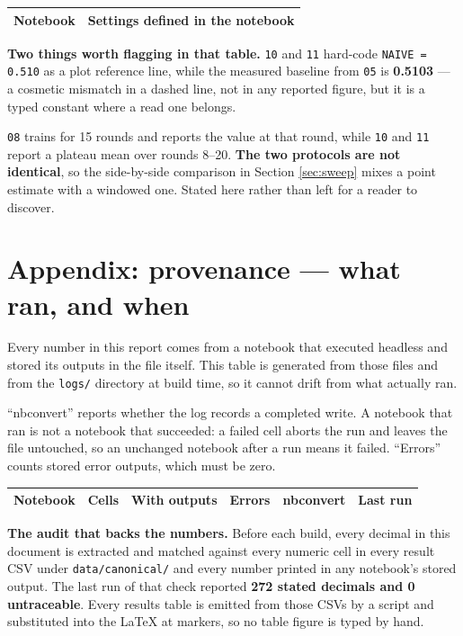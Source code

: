\documentclass[11pt,a4paper]{article}
\newcommand{\keypoint}[1]{%
  \par\vspace{0.4em}%
  \noindent\colorbox{fed!8}{\parbox{0.98\textwidth}{\vspace{0.2em}#1\vspace{0.2em}}}%
  \par\vspace{0.4em}}
\begin{document}
\begin{center}
\scriptsize
\begin{tabular}{@{}lp{11.2cm}@{}}
\toprule
\textbf{Notebook} & \textbf{Settings defined in the notebook} \\
\midrule
\bottomrule
\end{tabular}
\end{center}

\keypoint{\textbf{Two things worth flagging in that table.} \texttt{10} and \texttt{11} hard-code
\texttt{NAIVE = 0.510} as a plot reference line, while the measured baseline from \texttt{05} is
\textbf{0.5103} --- a cosmetic mismatch in a dashed line, not in any reported figure, but it is a typed
constant where a read one belongs.

\texttt{08} trains for 15 rounds and reports the value at that round, while \texttt{10} and
\texttt{11} report a plateau mean over rounds 8--20. \textbf{The two protocols are not identical}, so
the side-by-side comparison in Section \ref{sec:sweep} mixes a point estimate with a windowed one. Stated here rather
than left for a reader to discover.}

\section{Appendix: provenance --- what ran, and when}

Every number in this report comes from a notebook that executed headless and stored its outputs in the
file itself. This table is generated from those files and from the \texttt{logs/} directory at build
time, so it cannot drift from what actually ran.

``nbconvert'' reports whether the log records a completed write. A notebook that ran is not a notebook
that succeeded: a failed cell aborts the run and leaves the file untouched, so an unchanged notebook
after a run means it failed. ``Errors'' counts stored error outputs, which must be zero.

\begin{center}
\footnotesize
\begin{tabular}{@{}lrrrll@{}}
\toprule
\textbf{Notebook} & \textbf{Cells} & \textbf{With outputs} & \textbf{Errors} & \textbf{nbconvert} & \textbf{Last run} \\
\midrule
\bottomrule
\end{tabular}
\end{center}

\keypoint{\textbf{The audit that backs the numbers.} Before each build, every decimal in this document
is extracted and matched against every numeric cell in every result CSV under
\texttt{data/canonical/} and every number printed in any notebook's stored output. The last run of that
check reported \textbf{272 stated decimals and 0 untraceable}. Every results table is emitted from
those CSVs by a script and substituted into the LaTeX at markers, so no table figure is typed by hand.}
\end{document}
